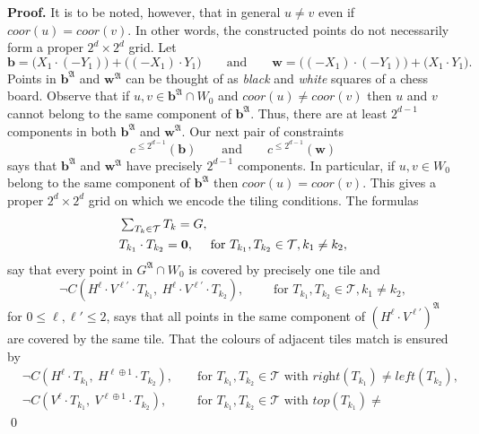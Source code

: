 \documentclass{LMCS}
\renewenvironment{proof}{\par\noindent\textbf{Proof.}}{\mbox{}\qed\par\medskip}
\theoremstyle{plain}
\newcommand{\coor}[1]{\textit{coor}(#1)}\newcommand{\neighb}[1]{\textit{4-nb}(#1)}
\begin{document}
\begin{proof}
It is to be noted,
however, that in general $u \ne v$ even if $\coor{u}=\coor{v}$. In
other words, the constructed points do not necessarily form a proper
$2^d \times 2^d$ grid. Let
\begin{equation*}
\mathbf{b} = \bigl(X_1 \cdot (-Y_1)\bigr) + \bigl((-X_1) \cdot
Y_1\bigr)\qquad\text{and}\qquad\mathbf{w} = \bigl((-X_1) \cdot
(-Y_1)\bigr) + \bigl(X_1 \cdot Y_1\bigr).
\end{equation*}
Points in $\mathbf{b}^{\mathfrak A}$ and $\mathbf{w}^{\mathfrak A}$
can be thought of as \emph{black} and \emph{white} squares of a
chess board. Observe that if $u,v\in
\mathbf{b}^{\mathfrak A}\cap W_0$ and $\coor{u} \ne \coor{v}$ then
$u$ and $v$ cannot belong to the same component of
$\mathbf{b}^{\mathfrak A}$. Thus, there are at least $2^{d-1}$
components in both $\mathbf{b}^{\mathfrak A}$ and
$\mathbf{w}^{\mathfrak A}$. Our next pair of constraints
\begin{equation}
c^{\leq 2^{d-1}}(\mathbf{b})\qquad\text{and}\qquad c^{\leq 2^{d-1}}(\mathbf{w})
\end{equation}
says that $\mathbf{b}^{\mathfrak A}$ and $\mathbf{w}^{\mathfrak A}$
have precisely $2^{d-1}$ components. In particular,
if $u,v\in W_0$ belong to the same component of
$\mathbf{b}^{\mathfrak A}$ then $\coor{u} = \coor{v}$. This gives
a proper $2^d \times 2^d$ grid on which we encode the tiling
conditions. The formulas
\begin{align}
&\textstyle\sum_{T_k\in\mathcal{T}} T_k = G,\\
& T_{k_1} \cdot T_{k_2} = \mathbf{0}, \quad \text{ for  } T_{k_1},T_{k_2}\in\mathcal{T}, k_1\ne k_2,
\end{align}
say that every point in $G^\mathfrak{A}\cap W_0$ is covered by precisely one tile and
\begin{equation}
\neg C(H^{\ell} \cdot V^{\ell'} \cdot T_{k_1}, \ H^{\ell} \cdot
V^{\ell'} \cdot T_{k_2}),\qquad  \text{ for }  T_{k_1},T_{k_2}\in\mathcal{T}, k_1\ne k_2,
\end{equation}
for $0 \leq \ell,\ell'  \leq 2$, says
that all points in the same component of $(H^\ell \cdot
V^{\ell'})^{\mathfrak A}$ are covered by the same tile. That the
colours of adjacent tiles match is ensured by
\begin{align}
&\neg C(H^\ell \cdot T_{k_1}, \ H^{\ell \oplus 1} \cdot  T_{k_2}), && \text{ for } T_{k_1},T_{k_2}\in\mathcal{T} \text{ with } \textit{right}(T_{k_1}) \ne
\textit{left}(T_{k_2}),\\
&\neg C(V^\ell \cdot T_{k_1}, \ V^{\ell \oplus 1} \cdot  T_{k_2}), && \text{ for } T_{k_1},T_{k_2}\in\mathcal{T} \text{ with } \textit{top}(T_{k_1}) \ne

\end{align}
\end{proof}
\end{document}
